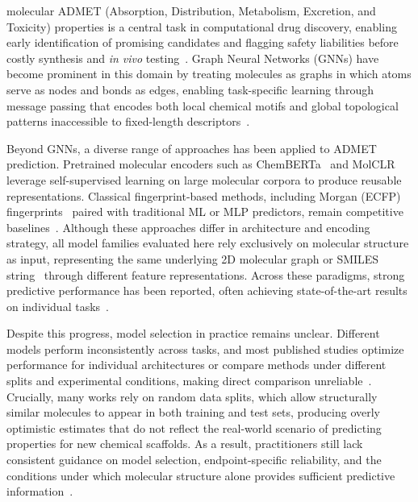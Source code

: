 \documentclass[journal]{IEEEtran}
\begin{document}
 molecular ADMET (Absorption, Distribution, Metabolism, Excretion, and Toxicity) properties is a central task in computational drug discovery, enabling early identification of promising candidates and flagging safety liabilities before costly synthesis and \emph{in vivo} testing~\cite{zhang2025admet}. Graph Neural Networks (GNNs) have become prominent in this domain by treating molecules as graphs in which atoms serve as nodes and bonds as edges, enabling task-specific learning through message passing that encodes both local chemical motifs and global topological patterns inaccessible to fixed-length descriptors~\cite{gilmer2017neural, yang2019dmpnn, attentiveFP}.

Beyond GNNs, a diverse range of approaches has been applied to ADMET prediction. Pretrained molecular encoders such as ChemBERTa~\cite{chemberta2} and MolCLR~\cite{molclr} leverage self-supervised learning on large molecular corpora to produce reusable representations. Classical fingerprint-based methods, including Morgan (ECFP) fingerprints~\cite{rogers2010ecfp} paired with traditional ML or MLP predictors, remain competitive baselines~\cite{maplight, rdkit2d_mlp}. Although these approaches differ in architecture and encoding strategy, all model families evaluated here rely exclusively on molecular structure as input, representing the same underlying 2D molecular graph or SMILES string~\cite{weininger1988smiles} through different feature representations. Across these paradigms, strong predictive performance has been reported, often achieving state-of-the-art results on individual tasks~\cite{huang2021therapeuticsdatacommonsmachine}.

Despite this progress, model selection in practice remains unclear. Different models perform inconsistently across tasks, and most published studies optimize performance for individual architectures or compare methods under different splits and experimental conditions, making direct comparison unreliable~\cite{wu2018moleculenet, yang2019dmpnn}. Crucially, many works rely on random data splits, which allow structurally similar molecules to appear in both training and test sets, producing overly optimistic estimates that do not reflect the real-world scenario of predicting properties for new chemical scaffolds. As a result, practitioners still lack consistent guidance on model selection, endpoint-specific reliability, and the conditions under which molecular structure alone provides sufficient predictive information~\cite{wu2018moleculenet, huang2021therapeuticsdatacommonsmachine}.
\end{document}
